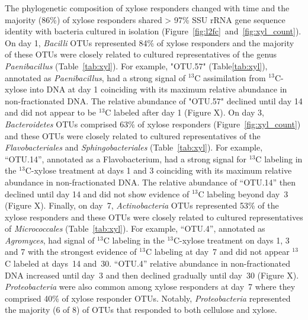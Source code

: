 The phylogenetic composition of xylose responders changed with time and the
majority (86\%) of xylose responders shared > 97\% SSU rRNA gene sequence
identity with bacteria cultured in isolation
(Figure~\ref{fig:l2fc}~and~\ref{fig:xyl_count}). On day 1, \textit{Bacilli}
OTUs represented 84\% of xylose responders and the majority of these OTUs were
closely related to cultured representatives of the genus \textit{Paenibacillus}
(Table~\ref{tab:xyl}). For example, "OTU.57" (Table\ref{tab:xyl}),
annotated as \textit{Paenibacillus}, had a strong signal of $^{13}$C
assimilation from $^{13}$C-xylose into DNA at day 1 coinciding with its maximum
relative abundance in non-fractionated DNA. The relative abundance of "OTU.57"
declined until day 14 and did not appear to be $^{13}$C labeled after day
1 (Figure X). On day 3, \textit{Bacteroidetes} OTUs comprised 63\% of xylose
responders (Figure~\ref{fig:xyl_count}) and these OTUs were closely related to
cultured representatives of the \textit{Flavobacteriales} and
\textit{Sphingobacteriales} (Table~\ref{tab:xyl}). For example, ``OTU.14'',
annotated as a Flavobacterium, had a strong signal for $^{13}$C labeling in the
$^{13}$C-xylose treatment at days 1 and 3 coinciding with its maximum relative
abundance in non-fractionated DNA. The relative abundance of ``OTU.14'' then
declined until day 14 and did not show evidence of $^{13}$C labeling beyond
day~3 (Figure X). Finally, on day~7, \textit{Actinobacteria} OTUs represented
53\% of the xylose responders and these OTUs were closely related to cultured
representatives of \textit{Micrococcales} (Table~\ref{tab:xyl}). For example,
``OTU.4'', annotated as \textit{Agromyces}, had signal of $^{13}$C labeling in
the $^{13}$C-xylose treatment on days 1, 3 and 7 with the strongest evidence of
$^{13}$C labeling at day~7 and did not appear $^{13}$C labeled at days~14
and~30. ``OTU.4'' relative abundance in non-fractionated DNA increased until
day~3 and then declined gradually until day~30 (Figure X).
\textit{Proteobacteria} were also common among xylose responders at day~7 where
they comprised 40\% of xylose responder OTUs. Notably, \textit{Proteobacteria}
represented the majority (6 of 8) of OTUs that responded to both cellulose and
xylose. 

